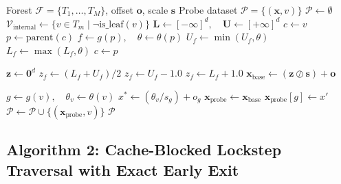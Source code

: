 \begin{algorithm}[t]
\caption{Boundary-Directed Probe Generation}
\label{alg:boundary_probe}
\footnotesize
\begin{algorithmic}[1]
\Require Forest $\mathcal{F} = \{T_1, \dots, T_M\}$, offset $\mathbf{o}$, scale $\mathbf{s}$
\Ensure Probe dataset $\mathcal{P} = \{(\mathbf{x}, v)\}$
\State $\mathcal{P} \gets \emptyset$
    \State $\mathcal{V}_{\text{internal}} \gets \{v \in T_m \mid \neg \text{is\_leaf}(v)\}$
        \State $\mathbf{L} \gets [-\infty]^d, \quad \mathbf{U} \gets [+\infty]^d$
        \State $c \gets v$
            \State $p \gets \text{parent}(c)$
            \State $f \gets g(p), \quad \theta \gets \theta(p)$
                \State $U_f \gets \min(U_f, \theta)$
            \Else
                \State $L_f \gets \max(L_f, \theta)$
            \EndIf
            \State $c \gets p$
        \EndWhile
        
        \State $\mathbf{z} \gets \mathbf{0}^d$
                \State $z_f \gets (L_f + U_f) / 2$
                \State $z_f \gets U_f - 1.0$
                \State $z_f \gets L_f + 1.0$
            \EndIf
        \EndFor
        \State $\mathbf{x}_{\text{base}} \gets (\mathbf{z} \oslash \mathbf{s}) + \mathbf{o}$
        
        \State $g \gets g(v), \quad \theta_v \gets \theta(v)$
        \State $x^* \gets (\theta_v / s_g) + o_g$
            \State $\mathbf{x}_{\text{probe}} \gets \mathbf{x}_{\text{base}}$
            \State $\mathbf{x}_{\text{probe}}[g] \gets x'$
            \State $\mathcal{P} \gets \mathcal{P} \cup \{(\mathbf{x}_{\text{probe}}, v)\}$
        \EndFor
    \EndFor
\EndFor
\State \Return $\mathcal{P}$
\end{algorithmic}
\end{algorithm}

\subsection{Algorithm 2: Cache-Blocked Lockstep Traversal with Exact Early Exit}

